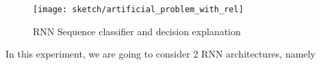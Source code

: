  \begin{figure}[!hbt]
		\centering
		\texttt{[image: sketch/artificial\_problem\_with\_rel]}
		\caption{RNN Sequence classifier and decision explanation} 
		\label{fig:artificial_problem}
\end{figure}


\begin{figure}[!htb]
\centering

     \hfill
\end{figure}

In this experiment, we are going to  consider 2 RNN architectures, namely

